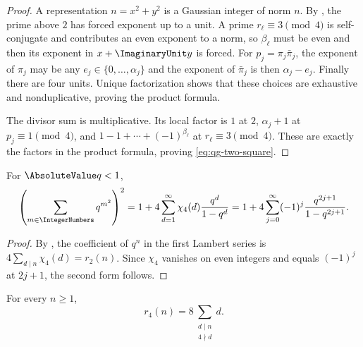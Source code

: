 \begin{proof}
A representation $n=x^2+y^2$ is a Gaussian integer of norm $n$.  By
, the prime above $2$ has forced exponent up to a
unit.  A prime $r_\ell\equiv3\pmod4$ is self-conjugate and contributes an
even exponent to a norm, so $\beta_\ell$ must be even and then its exponent
in $x+\ImaginaryUnit y$ is forced.  For
$p_j=\pi_j\bar\pi_j$, the exponent of $\pi_j$ may be any
$e_j\in\{0,\ldots,\alpha_j\}$ and the exponent of $\bar\pi_j$ is then
$\alpha_j-e_j$.  Finally there are four units.  Unique factorization shows
that these choices are exhaustive and nonduplicative, proving the product
formula.

The divisor sum is multiplicative.  Its local factor is $1$ at $2$,
$\alpha_j+1$ at $p_j\equiv1\pmod4$, and
$1-1+\cdots+(-1)^{\beta_\ell}$ at $r_\ell\equiv3\pmod4$.  These are exactly
the factors in the product formula, proving \eqref{eq:qg-two-square}.
\end{proof}

\begin{corollary}
\label{qg:cor-two-square-lambert}
For $\AbsoluteValue q<1$,
\begin{equation}
 \left(\sum_{m\in\IntegerNumbers}q^{m^2}\right)^2
 =1+4\sum_{d=1}^{\infty}\chi_4(d)\frac{q^d}{1-q^d}
 =1+4\sum_{j=0}^{\infty}(-1)^j
       \frac{q^{2j+1}}{1-q^{2j+1}}.
\label{eq:qg-two-square-lambert}
\end{equation}
\end{corollary}

\begin{proof}
By , the coefficient of $q^n$
in the first Lambert series is $4\sum_{d\mid n}\chi_4(d)=r_2(n)$.
Since $\chi_4$ vanishes on even integers and equals $(-1)^j$ at $2j+1$,
the second form follows.
\end{proof}

\begin{theorem}
\label{qg:thm-four-square}
For every $n\ge1$,
\begin{equation}
 r_4(n)=8\sum_{\substack{d\mid n\\4\nmid d}}d.
\label{eq:qg-four-square}
\end{equation}
\end{theorem}

